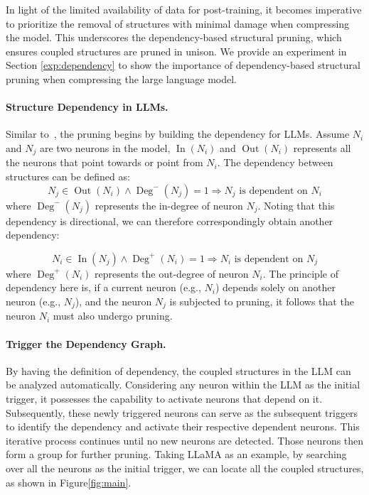 \documentclass{article}
\begin{document}
In light of the limited availability of data for post-training, it becomes imperative to prioritize the removal of structures with minimal damage when compressing the model. This underscores the dependency-based structural pruning, which ensures coupled structures are pruned in unison. We provide an experiment in Section \ref{exp:dependency} to show the importance of dependency-based structural pruning when compressing the large language model.

\paragraph{Structure Dependency in LLMs.} Similar to~\cite{fang2023depgraph}, the pruning begins by building the dependency for LLMs. Assume $N_i$ and $N_j$ are two neurons in the model, $\operatorname{In}(N_i)$ and $\operatorname{Out}(N_i)$ represents all the neurons that point towards or point from $N_i$. The dependency between structures can be defined as:
\begin{equation}
     N_j \in \operatorname{Out}(N_i) \wedge \operatorname{Deg}^-(N_j) = 1 \Rightarrow N_j \text{ is dependent on } N_i
\end{equation}
where $\operatorname{Deg}^-(N_j)$ represents the in-degree of neuron $N_j$. Noting that this dependency is directional, we can therefore correspondingly obtain another dependency:

\begin{equation}
     N_i \in \operatorname{In}(N_j) \wedge \operatorname{Deg}^+(N_i) = 1 \Rightarrow N_i \text{ is dependent on } N_j
\end{equation}
where $\operatorname{Deg}^+(N_i)$ represents the out-degree of neuron $N_i$. The principle of dependency here is, if a current neuron (e.g., $N_i$) depends solely on another neuron (e.g., $N_j$), and the neuron $N_j$ is subjected to pruning, it follows that the neuron $N_i$ must also undergo pruning.

\paragraph{Trigger the Dependency Graph.} By having the definition of dependency, the coupled structures in the LLM can be analyzed automatically. Considering any neuron within the LLM as the initial trigger, it possesses the capability to activate neurons that depend on it. Subsequently, these newly triggered neurons can serve as the subsequent triggers to identify the dependency and activate their respective dependent neurons. This iterative process continues until no new neurons are detected. Those neurons then form a group for further pruning. Taking LLaMA as an example, by searching over all the neurons as the initial trigger, we can locate all the coupled structures, as shown in Figure\ref{fig:main}.
\end{document}
